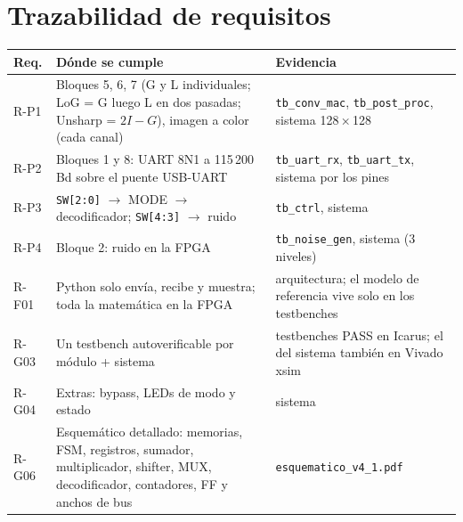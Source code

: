 \documentclass[11pt,a4paper]{article}
\begin{document}
\section{Trazabilidad de requisitos}

\begin{center}
\small
\begin{tabularx}{\linewidth}{l>{\raggedright\arraybackslash}X>{\raggedright\arraybackslash}X}
\toprule
\textbf{Req.} & \textbf{Dónde se cumple} & \textbf{Evidencia} \\
\midrule
R-P1 & Bloques 5, 6, 7 (G y L individuales; LoG = G luego L en dos pasadas; Unsharp = $2I - G$), imagen a color (cada canal) & \texttt{tb\_conv\_mac}, \texttt{tb\_post\_proc}, sistema 128\,×\,128 \\
R-P2 & Bloques 1 y 8: UART 8N1 a 115\,200\,Bd sobre el puente USB-UART & \texttt{tb\_uart\_rx}, \texttt{tb\_uart\_tx}, sistema por los pines \\
R-P3 & \texttt{SW[2:0]} $\to$ MODE $\to$ decodificador; \texttt{SW[4:3]} $\to$ ruido & \texttt{tb\_ctrl}, sistema \\
R-P4 & Bloque 2: ruido en la FPGA & \texttt{tb\_noise\_gen}, sistema (3 niveles) \\
R-F01 & Python solo envía, recibe y muestra; toda la matemática en la FPGA & arquitectura; el modelo de referencia vive solo en los testbenches \\
R-G03 & Un testbench autoverificable por módulo + sistema & 10 testbenches PASS en Icarus; el del sistema también en Vivado xsim \\
R-G04 & Extras: bypass, LEDs de modo y estado & sistema \\
R-G06 & Esquemático detallado: memorias, FSM, registros, sumador, multiplicador, shifter, MUX, decodificador, contadores, FF y anchos de bus & \texttt{esquematico\_v4\_1.pdf} \\
\bottomrule
\end{tabularx}
\end{center}
\end{document}

